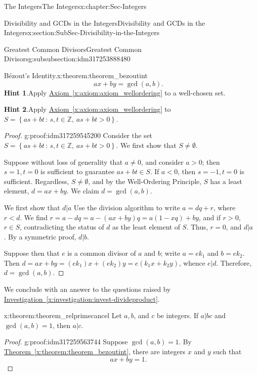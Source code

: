 \documentclass[oneside,10pt,]{book}
\newcommand{\blocktitlefont}{\relax}
\newcommand{\xreffont}{\relax}
\numberwithin{equation}{section}
\newcommand{\setof}[2]{{\left\{#1\,\colon\,#2\right\}}}
\def\Z{{\mathbb Z}}
\newcommand{\lt}{<}
\newcommand{\gt}{>}
\begin{document}
\begin{chapterptx}{The Integers}{}{The Integers}{}{}{x:chapter:Sec-Integers}
\begin{sectionptx}{Divisibility and GCDs in the Integers}{}{Divisibility and GCDs in the Integers}{}{}{x:section:SubSec-Divisibility-in-the-Integers}
\begin{subsubsectionptx}{Greatest Common Divisors}{}{Greatest Common Divisors}{}{}{g:subsubsection:idm317253888480}
\begin{theorem}{Bézout's Identity.}{}{x:theorem:theorem_bezoutint}
\begin{equation*}
ax + by = \gcd(a,b)\text{.}
\end{equation*}
%
\textbf{\blocktitlefont Hint 1}.\quad{}Apply \hyperref[x:axiom:axiom_wellordering]{Axiom~{\xreffont\ref{x:axiom:axiom_wellordering}}} to a well-chosen set.%
\par\smallskip%
\noindent\textbf{\blocktitlefont Hint 2}.\quad{}Apply \hyperref[x:axiom:axiom_wellordering]{Axiom~{\xreffont\ref{x:axiom:axiom_wellordering}}} to \(S = \setof{as+bt}{s,t\in\Z, \ as+bt \gt 0}\).%
\end{theorem}
\begin{proof}{}{g:proof:idm317259545200}
Consider the set \(S = \setof{as+bt}{s,t\in\Z, \ as+bt \gt 0}\). We first show that \(S\ne \emptyset\).%
\par
Suppose without loss of generality that \(a\ne 0\), and consider \(a \gt 0\); then \(s=1, t = 0\) is sufficient to guarantee \(as+bt\in S\). If \(a \lt 0\), then \(s = -1, t= 0\) is sufficient. Regardless, \(S\ne \emptyset\), and by the Well-Ordering Principle, \(S\) has a least element, \(d = ax+by\). We claim \(d = \gcd(a,b)\).%
\par
We first show that \(d|a\) Use the division algorithm to write \(a = dq + r\), where \(r \lt d\). We find \(r = a - dq = a - (ax+by)q = a(1-xq) + by\), and if \(r\gt 0\), \(r\in S\), contradicting the status of \(d\) as the least element of \(S\). Thus, \(r = 0\), and \(d|a\). By a symmetric proof, \(d|b\).%
\par
Suppose then that \(e\) is a common divisor of \(a\) and \(b\); write \(a = e k_1\) and \(b = e k_2\). Then \(d = ax + by = (ek_1)x + (ek_2)y = e(k_1x + k_2 y)\), whence \(e|d\). Therefore, \(d = \gcd(a,b)\).%
\end{proof}
We conclude with an answer to the questions raised by \hyperref[x:investigation:invest-divideproduct]{Investigation~{\xreffont\ref{x:investigation:invest-divideproduct}}}.%
\begin{theorem}{}{}{x:theorem:theorem_relprimecancel}%
Let \(a, b\), and \(c\) be integers. If \(a|bc\) and \(\gcd(a,b) = 1\), then \(a|c\).%
\end{theorem}
\begin{proof}{}{g:proof:idm317259563744}
Suppose \(\gcd(a,b) = 1\). By \hyperref[x:theorem:theorem_bezoutint]{Theorem~{\xreffont\ref{x:theorem:theorem_bezoutint}}}, there are integers \(x\) and \(y\) such that%
\begin{equation*}
ax+by = 1\text{.}
\end{equation*}

\end{proof}
\end{subsubsectionptx}
\end{sectionptx}
\end{chapterptx}
\end{document}
